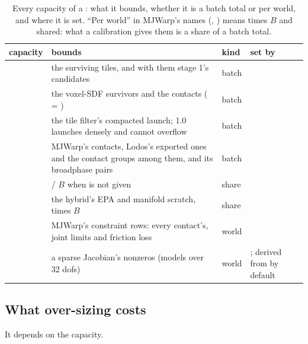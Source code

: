 \begin{table}[t]
\centering
\caption{Every capacity of a : what it bounds, whether it is a batch total or per world, and where it is set. ``Per world'' in MJWarp's names (, ) means times $B$ and shared: what a calibration gives them is a share of a batch total.}
\label{tab:caps}
\small
\begin{tabularx}{\linewidth}{@{}L{24mm}YL{12mm}L{30mm}@{}}
\toprule
capacity & bounds & kind & set by \\
\midrule
{} & the surviving tiles, and with them stage 1's candidates & batch &  \\
 & the voxel-SDF survivors and the contacts ( = ) & batch &  \\
 & the tile filter's compacted launch; 1.0 launches densely and cannot overflow & batch &  \\
 & MJWarp's contacts, Lodos's exported ones and the contact groups among them, and its broadphase pairs & batch &  \\
 &  / $B$ when  is not given & share &  \\
 & the hybrid's EPA and manifold scratch, times $B$ & share &  \\
 & MJWarp's constraint rows: every contact's, joint limits and friction loss & world &  \\
 & a sparse Jacobian's nonzeros (models over 32 dofs) & world & ; derived from  by default \\
\bottomrule
\end{tabularx}
\end{table}

\subsection{What over-sizing costs}\label{sec:capcost}

It depends on the capacity.


